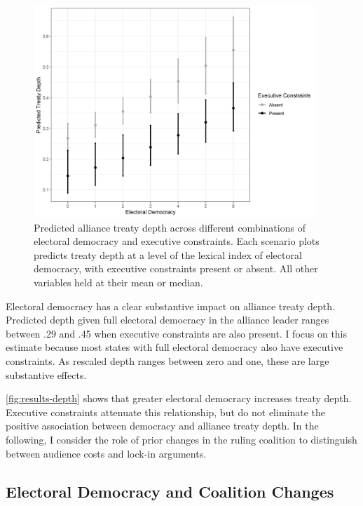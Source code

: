\documentclass[12pt]{article}
\begin{document}
\begin{figure}[hbtp]
\centering
\includegraphics[width=0.95\textwidth]{../figures/results-depth.png}
\caption{Predicted alliance treaty depth across different combinations of electoral democracy and executive constraints. Each scenario plots predicts treaty depth at a level of the lexical index of electoral democracy, with executive constraints present or absent. All other variables held at their mean or median.}
\label{fig:results-depth}
\end{figure}


Electoral democracy has a clear substantive impact on alliance treaty depth.
Predicted depth given full electoral democracy in the alliance leader ranges between .29 and .45 when executive constraints are also present.
I focus on this estimate because most states with full electoral democracy also have executive constraints. 
As rescaled depth ranges between zero and one, these are large substantive effects.


\autoref{fig:results-depth} shows that greater electoral democracy increases treaty depth. 
Executive constraints attenuate this relationship, but do not eliminate the positive association between democracy and alliance treaty depth. 
In the following, I consider the role of prior changes in the ruling coalition to distinguish between audience costs and lock-in arguments.


\subsection{Electoral Democracy and Coalition Changes}
\end{document}
